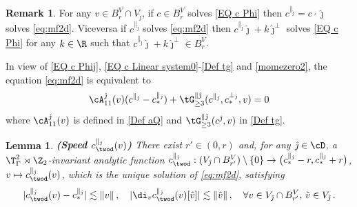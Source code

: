 \documentclass[11pt,a4paper,reqno]{article}
\numberwithin{equation}{section}
\newtheorem{lemma}[theorem]{Lemma}
\theoremstyle{definition}
\newtheorem{remark}[theorem]{Remark}
\begin{document}
\begin{remark} For any $v\in B_{r}^V\cap V_{\hat \jmath}$, if $c\in B_{r}^V$ solves \eqref{EQ c Phi} then  $c^{\parallel_{\hat \jmath}}=c\cdot \hat \jmath$ solves \eqref{eq:mf2d}.
Viceversa if $c^{\parallel_{\hat \jmath}}$ solves \eqref{eq:mf2d} then $c^{\parallel_{\hat \jmath}}\hat \jmath+k\hat \jmath^\bot$ solves \eqref{EQ c Phi} for any $k\in \R$ such that $c^{\parallel_{\hat \jmath}}\hat \jmath+k\hat \jmath^\bot\in B_{r}^V$.
\end{remark}
In view of \eqref{EQ c Phij}, 
\eqref{EQ c Linear system0}-\eqref{Def tg}
and \eqref{momezero2}, the equation \eqref{eq:mf2d} is equivalent to
\begin{equation}\label{EQ c Linear system}
    \cA^{\hat \jmath}_{11}(v)(c^{\parallel_{\hat \jmath}}-c_*^{\parallel_{\hat \jmath}})+ 
    \tG^{\parallel \hat \jmath}_{\geq 3} (c^{\parallel_{\hat \jmath}},c_*^{\bot_{\hat \jmath}},v) = 0 
\end{equation}
where $ \cA^{\hat \jmath}_{11}(v) $ is defined in 
\eqref{Def aQ}
and 
$\tG^{\parallel \hat \jmath}_{\geq 3} (c^{\hat \jmath},v)$  in \eqref{Def tg}.


\begin{lemma}\label{c on PJ}
{\bf (Speed $ c^{\parallel_{\hat \jmath}}_{\twod} (v)$)}
    There exist $ r'\in (0,r)$ and, for any ${\hat \jmath} \in \cD$, a $\T^2_\Gamma\rtimes \Z_2$-invariant analytic function
    $
        c^{\parallel_{\hat \jmath}}_{\twod} : 
         (V_{\hat \jmath} \cap B_{r'}^V )\setminus\{0\}\to \big(c^{\parallel_{\hat \jmath}}_*-r,c^{\parallel_{\hat \jmath}}_* +r\big) $, $ v \mapsto c^{\parallel_{\hat \jmath}}_{\twod} (v) $, 
    which is the unique solution of \eqref{eq:mf2d}, satisfying 
    \begin{equation}\label{tilde cQ-c*Q d tilde cQ(v)}
        |  c^{\parallel_{\hat \jmath}}_{\twod} (v)-  c^{\parallel_{\hat \jmath}}_* |\lesssim \|v\| \, , \quad |\di_v c^{\parallel_{\hat \jmath}}_{\twod} (v)[\hat v]|\lesssim \|\hat v\|\, , \quad  \forall v \in V_{\hat \jmath} \cap B_{r'}^V, \,  \hat v \in V_{\hat \jmath} \, .
    \end{equation}
\end{lemma}
\end{document}
